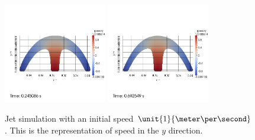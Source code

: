 \begin{figure}
\begin{center}
{}
\subcaptionbox{\label{top:jet:Py:5}}
{
\includegraphics[width=0.4\textwidth]{topology/JetPetit/speedy0004.jpg}
}
\subcaptionbox{\label{top:jet:Py:6}}
{
\includegraphics[width=0.4\textwidth]{topology/JetPetit/speedy0005.jpg}
}
\end{center}
\caption{Jet simulation with an initial speed $\unit{1}{\meter \per \second}$.
This is the representation of speed in the $y$ direction.}
\label{top:jet:Py}
\end{figure}